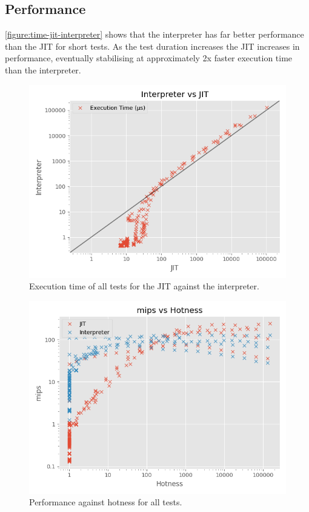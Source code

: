 \subsection{Performance}

\autoref{figure:time-jit-interpreter} shows that the interpreter has far better performance than the JIT for short tests. As the test duration increases the JIT increases in performance, eventually stabilising at approximately 2x faster execution time than the interpreter.

\begin{figure}
    \centering
    \includegraphics{output/graphs/scatter/time.png}
    \caption{Execution time of all tests for the JIT against the interpreter.}
    \label{figure:time-jit-interpreter}
\end{figure}

\begin{figure}
    \centering
    \includegraphics{output/graphs/scatter/hotness.png}
    \caption{Performance against hotness for all tests.}
    \label{figure:hotness}
\end{figure}

